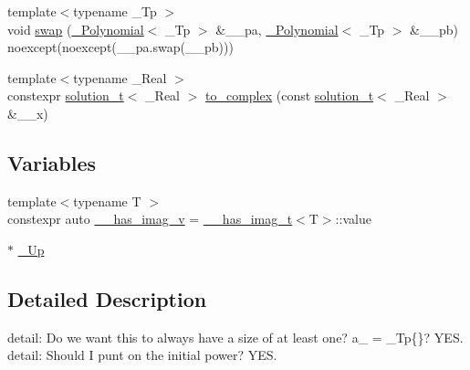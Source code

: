 \begin{DoxyCompactItemize}
\item 
{\footnotesize template$<$typename \+\_\+\+Tp $>$ }\\void \hyperlink{namespace____gnu__cxx_a10d002d78eb10d846416335ca9599c7a}{swap} (\hyperlink{class____gnu__cxx_1_1__Polynomial}{\+\_\+\+Polynomial}$<$ \+\_\+\+Tp $>$ \&\+\_\+\+\_\+pa, \hyperlink{class____gnu__cxx_1_1__Polynomial}{\+\_\+\+Polynomial}$<$ \+\_\+\+Tp $>$ \&\+\_\+\+\_\+pb) noexcept(noexcept(\+\_\+\+\_\+pa.\+swap(\+\_\+\+\_\+pb)))
\item 
{\footnotesize template$<$typename \+\_\+\+Real $>$ }\\constexpr \hyperlink{namespace____gnu__cxx_ae20ea642de50eb361074c62676b0159c}{solution\+\_\+t}$<$ \+\_\+\+Real $>$ \hyperlink{namespace____gnu__cxx_aa21adeccc5b87713003459ab7f08fc7b}{to\+\_\+complex} (const \hyperlink{namespace____gnu__cxx_ae20ea642de50eb361074c62676b0159c}{solution\+\_\+t}$<$ \+\_\+\+Real $>$ \&\+\_\+\+\_\+x)
\end{DoxyCompactItemize}
\subsection*{Variables}
\begin{DoxyCompactItemize}
\item 
{\footnotesize template$<$typename T $>$ }\\constexpr auto \hyperlink{namespace____gnu__cxx_afa2404a914b06f950f3a46e75aca51a9}{\+\_\+\+\_\+has\+\_\+imag\+\_\+v} = \hyperlink{struct____gnu__cxx_1_1____has__imag__t}{\+\_\+\+\_\+has\+\_\+imag\+\_\+t}$<$T$>$\+::value
\item 
$\ast$ \hyperlink{namespace____gnu__cxx_ab693ea357b6429b331e0bf09f9442385}{\+\_\+\+Up}
\end{DoxyCompactItemize}


\subsection{Detailed Description}
detail\+: Do we want this to always have a size of at least one? a\+\_ = \+\_\+\+Tp\{\}? Y\+ES. detail\+: Should I punt on the initial power? Y\+ES.

